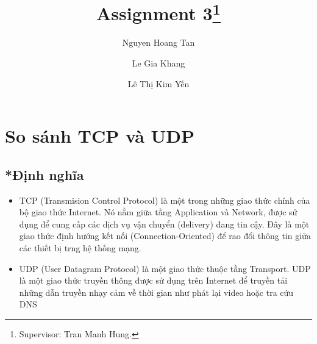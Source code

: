 \documentclass[APA,STIX1COL]{WileyNJD-v2}
\begin{document}
\title{Assignment 3\protect\thanks{Supervisor: Tran Manh Hung.}}

\author[1]{Nguyen Hoang Tan}

\author[2]{Le Gia Khang}

\author[3]{Lê Thị Kim Yến}





\address[1]{, }

\address[2]{, }

\address[2]{, }







\maketitle



\section{So sánh TCP và UDP}\label{sec1}
\subsection*{*Định nghĩa}
\begin{itemize}
  \item TCP (Transmision Control Protocol) là một trong những giao thức chính của bộ giao thức Internet. Nó nằm giữa tầng Application và Network, được sử dụng để cung cấp các dịch vụ vận chuyển (delivery) đang tin cậy. Đây là một giao thức định hướng kết nối (Connection-Oriented)
để rao đổi thông tin giữa các thiết bị trng hệ thống mạng.
  \item UDP (User Datagram Protocol) là một giao thức thuộc tầng Transport. UDP là một giao thức
truyền thông được sử dụng trên Internet để truyền tải những dẫn truyền nhạy cảm về thời gian như phát lại
video hoặc tra cứu DNS
\end{itemize}
\end{document}
